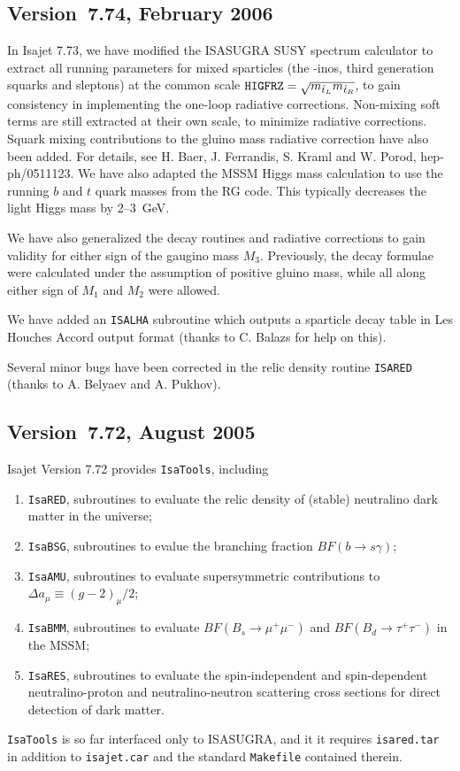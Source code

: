 \subsection{Version~7.74, February 2006}

In Isajet 7.73, we have modified the ISASUGRA SUSY spectrum calculator
to extract all running parameters for mixed sparticles (the -inos, third
generation squarks and sleptons) at the common scale ${\tt
HIGFRZ}=\sqrt{m_{\tilde t_L} m_{\tilde t_R}}$, to gain consistency in
implementing the one-loop radiative corrections. Non-mixing soft terms
are still extracted at their own scale, to minimize radiative
corrections.  Squark mixing contributions to the gluino mass radiative
correction have also been added. For details, see H. Baer, J. Ferrandis,
S. Kraml and W. Porod, hep-ph/0511123.
We have also adapted the MSSM Higgs mass calculation to use the
running $b$ and $t$ quark masses from the RG code. This typically
decreases the light Higgs mass by 2--3~GeV.

We have also generalized the decay routines and radiative corrections to
gain validity for either sign of the gaugino mass $M_3$. Previously, the
decay formulae were calculated under the assumption of positive gluino
mass, while all along either sign of $M_1$ and $M_2$ were allowed.

We have added an \verb|ISALHA| subroutine which outputs a sparticle
decay table in Les Houches Accord output format (thanks to C. Balazs for
help on this).

Several minor bugs have been corrected in the relic density routine
\verb|ISARED| (thanks to A. Belyaev and A. Pukhov).

\subsection{Version~7.72, August 2005}

Isajet Version 7.72 provides \verb|IsaTools|, including
\begin{enumerate}
\item \verb|IsaRED|, subroutines to evaluate the relic density of
(stable) neutralino dark matter in the universe;
\item \verb|IsaBSG|, subroutines to evalue the branching fraction
$BF(b\to s\gamma )$;
\item \verb|IsaAMU|, subroutines to evaluate supersymmetric
contributions to
$\Delta a_\mu\equiv (g-2)_\mu/2$;
\item \verb|IsaBMM|, subroutines to evaluate $BF(B_s\rightarrow
\mu^+\mu^-)$ and $BF(B_d\rightarrow \tau^+\tau^- )$ in the MSSM;
\item \verb|IsaRES|, subroutines to evaluate the spin-independent and
spin-dependent neutralino-proton and neutralino-neutron scattering cross
sections for direct detection of dark matter.
\end{enumerate}
\verb|IsaTools| is so far interfaced only to ISASUGRA, and it it
requires \verb|isared.tar| in addition to \verb|isajet.car| and the
standard \verb|Makefile| contained therein.

